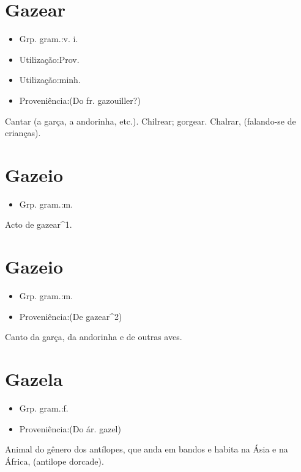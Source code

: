 \section{Gazear}
\begin{itemize}
\item {Grp. gram.:v. i.}
\end{itemize}
\begin{itemize}
\item {Utilização:Prov.}
\end{itemize}
\begin{itemize}
\item {Utilização:minh.}
\end{itemize}
\begin{itemize}
\item {Proveniência:(Do fr. \textunderscore gazouiller\textunderscore ?)}
\end{itemize}
Cantar (a garça, a andorinha, etc.).
Chilrear; gorgear.
Chalrar, (falando-se de crianças).
\section{Gazeio}
\begin{itemize}
\item {Grp. gram.:m.}
\end{itemize}
Acto de gazear^1.
\section{Gazeio}
\begin{itemize}
\item {Grp. gram.:m.}
\end{itemize}
\begin{itemize}
\item {Proveniência:(De \textunderscore gazear\textunderscore ^2)}
\end{itemize}
Canto da garça, da andorinha e de outras aves.
\section{Gazela}
\begin{itemize}
\item {Grp. gram.:f.}
\end{itemize}
\begin{itemize}
\item {Proveniência:(Do ár. \textunderscore gazel\textunderscore )}
\end{itemize}
Animal do gênero dos antílopes, que anda em bandos e habita na Ásia e na África, (\textunderscore antilope dorcade\textunderscore ).

